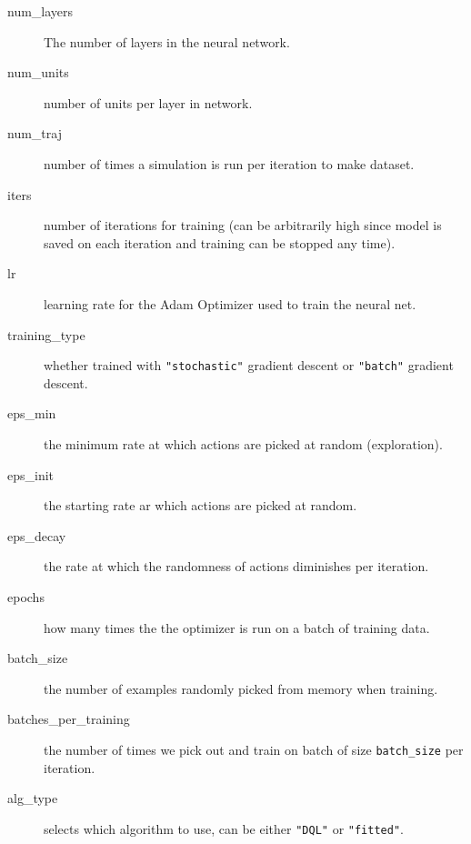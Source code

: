 \documentclass[onecolumn,letterpaper,11pt]{article}
\begin{document}
\begin{description}
	\item[num\_layers] The number of layers in the neural network.
	\item[num\_units] number of units per layer in network.
	\item[num\_traj] number of times a simulation is run per iteration to make dataset.
	\item[iters] number of iterations for training (can be arbitrarily high since model is saved on each iteration and training can be stopped any time).
	\item[lr] learning rate for the Adam Optimizer used to train the neural net.
	\item[training\_type] whether trained with \texttt{"stochastic"} gradient descent or \texttt{"batch"} gradient descent.
	\item[eps\_min] the minimum rate at which actions are picked at random (exploration).
	\item[eps\_init] the starting rate ar which actions are picked at random.
	\item[eps\_decay] the rate at which the randomness of actions diminishes per iteration.
	\item[epochs] how many times the the optimizer is run on a batch of training data.
	\item[batch\_size] the number of examples randomly picked from memory when training.
	\item[batches\_per\_training] the number of times we pick out and train on batch of size \texttt{batch\_size} per iteration.
	\item[alg\_type] selects which algorithm to use, can be either \texttt{"DQL"} or \texttt{"fitted"}.
\end{description}
\end{document}
